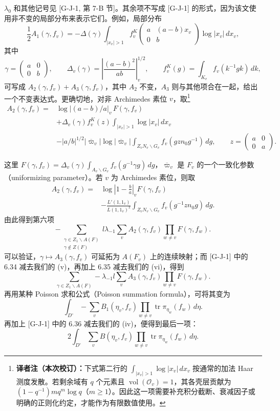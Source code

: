 $\lambda_0$ 和其他记号见 [G-J-1, 第 7-B 节]。其余项不写成 [G-J-1] 的形式，因为该文使用非不变的局部分布来表示它们。例如，局部分布
\[
 \frac12 A_1(\gamma,f_v)=-\Delta(\gamma)
 \int_{|x_v|>1}f_v^K\begin{pmatrix}a&(a-b)x_v\\0&b\end{pmatrix}
 \log|x_v|\,dx_v,
\]
其中
\[
 \gamma=\begin{pmatrix}a&0\\0&b\end{pmatrix},\qquad
 \Delta_v(\gamma)=\left|\frac{(a-b)^2}{ab}\right|_v^{1/2},\qquad
 f_v^K(g)=\int_{K_v}f_v(k^{-1}gk)\,dk,
\]
可写成 $A_2(\gamma,f_v)+A_3(\gamma,f_v)$，其中 $A_2$ 不变，$A_3$ 则与其他项合在一起，给出一个不变表达式。更确切地，对非 Archimedes 素位 $v$，取\footnote{\textbf{译者注（本次校订）：}下式第二行的 $\int_{|x_v|>1}\log|x_v|\,dx_v$ 按通常的加法 Haar 测度发散。若剩余域有 $q$ 个元素且 $\operatorname{vol}(\mathcal O_v)=1$，其各壳层贡献为 $(1-q^{-1})m q^m\log q$（$m\ge1$）。因此这一项需要补充积分截断、衰减因子或明确的正则化约定，才能作为有限数值使用。}
\[
 \begin{aligned}
 A_2(\gamma,f_v)={}&\log|(a-b)/a|_v\,F(\gamma,f_v)\\
 &+\Delta_v(\gamma)f_v^K(z)\int_{|x_v|>1}\log|x_v|\,dx_v\\
 &-|a/b|^{1/2}|\overline\varpi_v|\log|\overline\varpi_v|
 \int_{Z_vN_v\backslash G_v}f_v(gzn_0g^{-1})\,dg,
 \qquad z=\begin{pmatrix}a&0\\0&a\end{pmatrix}.
 \end{aligned}
\]

这里 $F(\gamma,f_v)=\Delta_v(\gamma)\int_{A_v\backslash G_v}f_v(g^{-1}\gamma g)\,dg$，$\overline\varpi_v$ 是 $F_v$ 的一个一致化参数（uniformizing parameter）。若 $v$ 为 Archimedes 素位，则取
\[
 \begin{aligned}
 A_2(\gamma,f_v)={}&\log\left|1-\frac ba\right|_vF(\gamma,f_v)\\
 &-\frac{L'(1,1_v)}{L(1,1_v)^2}
 \int_{Z_vN_v\backslash G_v}f_v(g^{-1}zn_0g)\,dg.
 \end{aligned}
\]
由此得到第六项
\begin{equation}
 -\sum_{\substack{\gamma\in Z_1\backslash A(F)\\\gamma\notin Z(F)}}
 l\lambda_{-1}\sum_v A_2(\gamma,f_v)\prod_{w\ne v}F(\gamma,f_w).
 \tag{vi}
\end{equation}
可以验证，$\gamma\mapsto A_3(\gamma,f_v)$ 可延拓为 $A(F_v)$ 上的连续映射；而 [G-J-1] 中的 6.34 减去我们的 (v)，再加上 6.35 减去我们的 (vi)，得到
\[
 \sum_{\gamma\in Z_1\backslash A(F)}
 -\lambda_{-1}l\sum_v A_3(\gamma,f_v)\prod_{w\ne v}F(\gamma,f_w).
\]
再用某种 Poisson 求和公式（Poisson summation formula），可将其变为
\[
 \int_{D^\circ}-\sum_v B_1(\eta_v,f_v)
 \prod_{w\ne v}\operatorname{tr}\pi_{\eta_w}(f_w)\,d\eta.
\]
再加上 [G-J-1] 中的 6.36 减去我们的 (iv)，便得到最后一项：
\begin{equation}
 2\int_{D^\circ}\sum_v B(\eta_v,f_v)
 \prod_{w\ne v}\operatorname{tr}\pi_{\eta_w}(f_w)\,d\eta.
 \tag{vii}
\end{equation}

